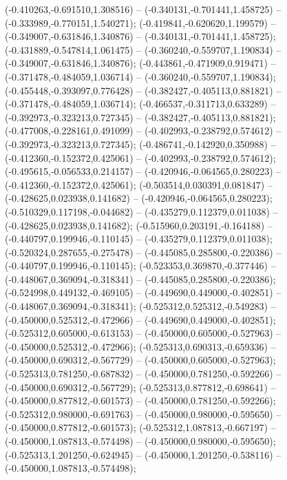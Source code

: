  (-0.410263,-0.691510,1.308516) -- (-0.340131,-0.701441,1.458725) -- (-0.333989,-0.770151,1.540271);
 (-0.419841,-0.620620,1.199579) -- (-0.349007,-0.631846,1.340876) -- (-0.340131,-0.701441,1.458725);
 (-0.431889,-0.547814,1.061475) -- (-0.360240,-0.559707,1.190834) -- (-0.349007,-0.631846,1.340876);
 (-0.443861,-0.471909,0.919471) -- (-0.371478,-0.484059,1.036714) -- (-0.360240,-0.559707,1.190834);
 (-0.455448,-0.393097,0.776428) -- (-0.382427,-0.405113,0.881821) -- (-0.371478,-0.484059,1.036714);
 (-0.466537,-0.311713,0.633289) -- (-0.392973,-0.323213,0.727345) -- (-0.382427,-0.405113,0.881821);
 (-0.477008,-0.228161,0.491099) -- (-0.402993,-0.238792,0.574612) -- (-0.392973,-0.323213,0.727345);
 (-0.486741,-0.142920,0.350988) -- (-0.412360,-0.152372,0.425061) -- (-0.402993,-0.238792,0.574612);
 (-0.495615,-0.056533,0.214157) -- (-0.420946,-0.064565,0.280223) -- (-0.412360,-0.152372,0.425061);
 (-0.503514,0.030391,0.081847) -- (-0.428625,0.023938,0.141682) -- (-0.420946,-0.064565,0.280223);
 (-0.510329,0.117198,-0.044682) -- (-0.435279,0.112379,0.011038) -- (-0.428625,0.023938,0.141682);
 (-0.515960,0.203191,-0.164188) -- (-0.440797,0.199946,-0.110145) -- (-0.435279,0.112379,0.011038);
 (-0.520324,0.287655,-0.275478) -- (-0.445085,0.285800,-0.220386) -- (-0.440797,0.199946,-0.110145);
 (-0.523353,0.369870,-0.377446) -- (-0.448067,0.369094,-0.318341) -- (-0.445085,0.285800,-0.220386);
 (-0.524998,0.449132,-0.469105) -- (-0.449690,0.449000,-0.402851) -- (-0.448067,0.369094,-0.318341);
 (-0.525312,0.525312,-0.549283) -- (-0.450000,0.525312,-0.472966) -- (-0.449690,0.449000,-0.402851);
 (-0.525312,0.605000,-0.613153) -- (-0.450000,0.605000,-0.527963) -- (-0.450000,0.525312,-0.472966);
 (-0.525313,0.690313,-0.659336) -- (-0.450000,0.690312,-0.567729) -- (-0.450000,0.605000,-0.527963);
 (-0.525313,0.781250,-0.687832) -- (-0.450000,0.781250,-0.592266) -- (-0.450000,0.690312,-0.567729);
 (-0.525313,0.877812,-0.698641) -- (-0.450000,0.877812,-0.601573) -- (-0.450000,0.781250,-0.592266);
 (-0.525312,0.980000,-0.691763) -- (-0.450000,0.980000,-0.595650) -- (-0.450000,0.877812,-0.601573);
 (-0.525312,1.087813,-0.667197) -- (-0.450000,1.087813,-0.574498) -- (-0.450000,0.980000,-0.595650);
 (-0.525313,1.201250,-0.624945) -- (-0.450000,1.201250,-0.538116) -- (-0.450000,1.087813,-0.574498);
